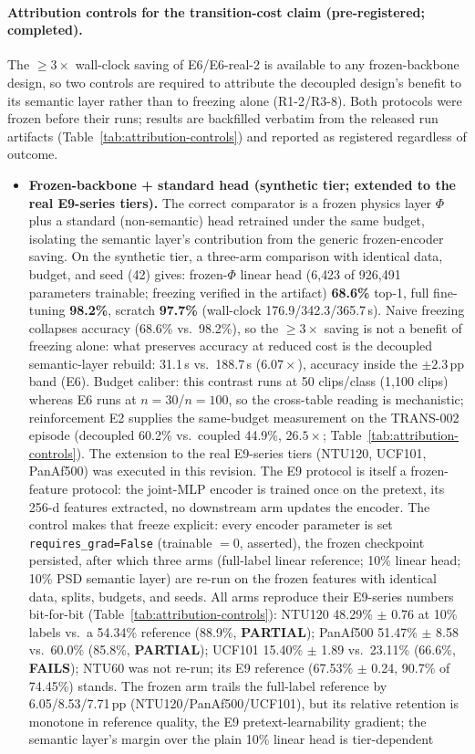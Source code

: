 \paragraph{Attribution controls for the transition-cost claim (pre-registered; completed).}
The $\geq 3\times$ wall-clock saving of E6/E6-real-2 is available to any frozen-backbone design, so two controls are required to attribute the decoupled design's benefit to its semantic layer rather than to freezing alone (R1-2/R3-8). Both protocols were frozen before their runs; results are backfilled verbatim from the released run artifacts (Table~\ref{tab:attribution-controls}) and reported as registered regardless of outcome.
\begin{itemize}
\item \textbf{Frozen-backbone + standard head (synthetic tier; extended to the real E9-series tiers).} The correct comparator is a frozen physics layer $\Phi$ plus a standard (non-semantic) head retrained under the same budget, isolating the semantic layer's contribution from the generic frozen-encoder saving. On the synthetic tier, a three-arm comparison with identical data, budget, and seed (42) gives: frozen-$\Phi$ linear head (6{,}423 of 926{,}491 parameters trainable; freezing verified in the artifact) \textbf{68.6\%} top-1, full fine-tuning \textbf{98.2\%}, scratch \textbf{97.7\%} (wall-clock 176.9/342.3/365.7\,s). Naive freezing collapses accuracy (68.6\% vs.\ 98.2\%), so the $\geq 3\times$ saving is not a benefit of freezing alone: what preserves accuracy at reduced cost is the decoupled semantic-layer rebuild: 31.1\,s vs.\ 188.7\,s ($6.07\times$), accuracy inside the $\pm 2.3$\,pp band (E6). Budget caliber: this contrast runs at 50 clips/class (1{,}100 clips) whereas E6 runs at $n{=}30$/$n{=}100$, so the cross-table reading is mechanistic; reinforcement E2 supplies the same-budget measurement on the TRANS-002 episode (decoupled 60.2\% vs.\ coupled 44.9\%, $26.5\times$; Table~\ref{tab:attribution-controls}). The extension to the real E9-series tiers (NTU120, UCF101, PanAf500) was executed in this revision. The E9 protocol is itself a frozen-feature protocol: the joint-MLP encoder is trained once on the pretext, its 256-d features extracted, no downstream arm updates the encoder. The control makes that freeze explicit: every encoder parameter is set \texttt{requires\_grad=False} (trainable $=0$, asserted), the frozen checkpoint persisted, after which three arms (full-label linear reference; 10\% linear head; 10\% PSD semantic layer) are re-run on the frozen features with identical data, splits, budgets, and seeds. All arms reproduce their E9-series numbers bit-for-bit (Table~\ref{tab:attribution-controls}): NTU120 48.29\% $\pm$ 0.76 at 10\% labels vs.\ a 54.34\% reference (88.9\%, \textbf{PARTIAL}); PanAf500 51.47\% $\pm$ 8.58 vs.\ 60.0\% (85.8\%, \textbf{PARTIAL}); UCF101 15.40\% $\pm$ 1.89 vs.\ 23.11\% (66.6\%, \textbf{FAILS}); NTU60 was not re-run; its E9 reference (67.53\% $\pm$ 0.24, 90.7\% of 74.45\%) stands. The frozen arm trails the full-label reference by 6.05/8.53/7.71\,pp (NTU120/PanAf500/UCF101), but its relative retention is monotone in reference quality, the E9 pretext-learnability gradient; the semantic layer's margin over the plain 10\% linear head is tier-dependent 
\end{itemize}
